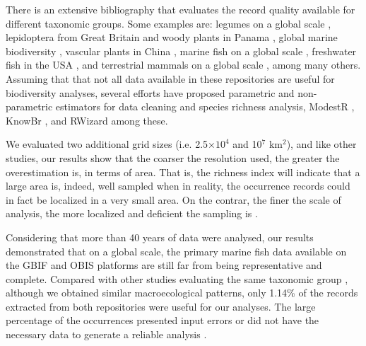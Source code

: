 \documentclass[12pt,authoryear]{elsarticle}
\begin{document}
There is an extensive bibliography that evaluates the record quality available for different taxonomic groups. Some examples are: legumes on a global scale \citep{yesson2007}, lepidoptera from Great Britain and woody plants in Panama \citep{chao2009}, global marine biodiversity \citep{tittensor2010global}, vascular plants in China \citep{yang2013geographical}, marine fish on a global scale \citep{mora2008completeness,garcia2015}, freshwater fish in the USA \citep{troia2017,pelayo2018}, and terrestrial mammals on a global scale \citep{oliver2021}, among many others. Assuming that that not all data available in these repositories are useful for biodiversity analyses, several efforts have proposed  parametric and non-parametric estimators for data cleaning and species richness analysis, ModestR \citep{garcia2013}, KnowBr \citep{lobo2018}, and RWizard \citep{guisande&lobo} among these.

We evaluated two additional grid sizes (i.e. 2.5$\times 10^4$  and 10$^7$ km$^2$), and like other studies,
%
our results show that the coarser the resolution used, the greater the overestimation is, in terms of area. That is, the richness index will indicate that a large area is, indeed, well sampled when in reality, the occurrence records could in fact be localized in a very small area. On the contrar, the finer the scale of analysis, the more localized and deficient the sampling is
%
\citep{tittensor2010global,garcia2015,meyer2015,troia2016,troia2017}.

Considering that more than 40 years of data were analysed, our results demonstrated that on a global scale, the primary marine fish data available on the GBIF and OBIS platforms are still far from being representative and complete. Compared with other studies evaluating the same taxonomic group \citep{mora2008completeness,garcia2015}, although we obtained similar macroecological patterns, only 1.14\% of the records extracted from both repositories were useful for our analyses. The large percentage of the occurrences presented input errors or did not have the necessary data to generate a reliable analysis \citep{yesson2007,garcia2014}.
\end{document}
